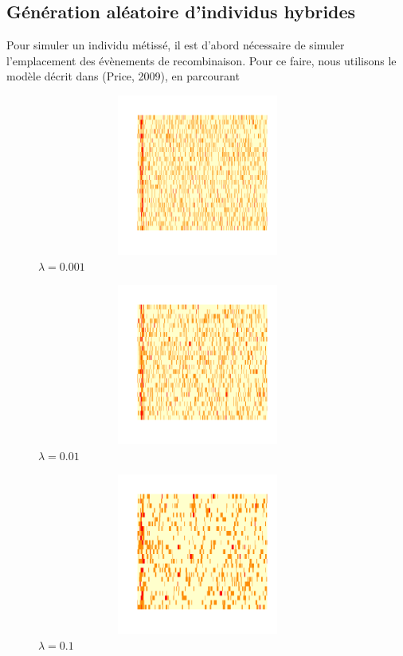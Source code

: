 \documentclass[12pt,twoside]{reedthesis}
\theoremstyle{definition}
\theoremstyle{definition}
\theoremstyle{remark}
\begin{document}
  \subsection{Génération aléatoire d'individus
  hybrides}\label{generation-aleatoire-dindividus-hybrides}
  
  Pour simuler un individu métissé, il est d'abord nécessaire de simuler
  l'emplacement des évènements de recombinaison. Pour ce faire, nous
  utilisons le modèle décrit dans (Price, 2009), en parcourant
  
  \begin{figure}
  
  {\centering \includegraphics[width=400px,height=200px]{figure/ancestry_heatmap_lambda_0001} 
  
  }
  
  \caption{$\lambda = 0.001$}\label{fig:lambda0001}
  \end{figure}\begin{figure}
  
  {\centering \includegraphics[width=400px,height=200px]{figure/ancestry_heatmap_lambda_001} 
  
  }
  
  \caption{$\lambda = 0.01$}\label{fig:lambda001}
  \end{figure}\begin{figure}
  
  {\centering \includegraphics[width=400px,height=200px]{figure/ancestry_heatmap_lambda_01} 
  
  }
  
  \caption{$\lambda = 0.1$}\label{fig:lambda01}
  \end{figure}
  
\end{document}
